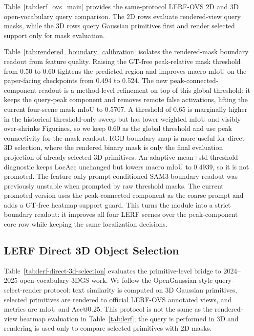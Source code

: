 \documentclass[10pt,twocolumn,letterpaper]{article}
\begin{document}


Table~\ref{tab:lerf_ovs_main} provides the same-protocol LERF-OVS 2D and 3D
open-vocabulary query comparison. The 2D rows evaluate rendered-view query masks,
while the 3D rows query Gaussian primitives first and render selected support
only for mask evaluation.



Table~\ref{tab:rendered_boundary_calibration} isolates the rendered-mask
boundary readout from feature quality. Raising the GT-free peak-relative mask
threshold from 0.50 to 0.60 tightens the predicted region and improves macro
mIoU on the paper-facing checkpoints from 0.494 to 0.524. The new
peak-connected-component readout is a method-level refinement on top of this
global threshold: it keeps the query-peak component and removes remote false
activations, lifting the current four-scene mask mIoU to 0.5707. A threshold of
0.65 is marginally higher in the historical threshold-only sweep but has lower
weighted mIoU and visibly over-shrinks Figurines, so we keep 0.60 as the global
threshold and use peak connectivity for the mask readout.
RGB boundary snap is more useful for direct 3D selection, where the rendered
binary mask is only the final evaluation projection of already selected 3D
primitives. An adaptive mean+std threshold diagnostic keeps LocAcc unchanged
but lowers macro mIoU to 0.4939, so it is not promoted.
The feature-only prompt-conditioned SAM3 boundary readout was previously
unstable when prompted by raw threshold masks. The current promoted version uses
the peak-connected component as the coarse prompt and adds a GT-free heatmap
support guard. This turns the module into a strict boundary readout: it improves
all four LERF scenes over the peak-component core row while keeping the same
localization decisions.

\subsection{LERF Direct 3D Object Selection}



Table~\ref{tab:lerf-direct-3d-selection} evaluates the primitive-level bridge to
2024--2025 open-vocabulary 3DGS work. We follow the OpenGaussian-style
query-select-render protocol: text similarity is computed on 3D Gaussian
primitives, selected primitives are rendered to official LERF-OVS annotated
views, and metrics are mIoU and Acc@0.25. This protocol is not the same as the
rendered-view heatmap evaluation in Table~\ref{tab:lerf}; the query is performed
in 3D and rendering is used only to compare selected primitives with 2D masks.
\end{document}
